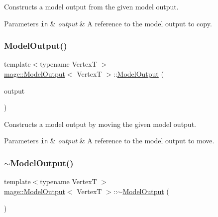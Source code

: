 Constructs a model output from the given model output.


\begin{DoxyParams}[1]{Parameters}
\mbox{\tt in}  & {\em output} & A reference to the model output to copy. \\
\hline
\end{DoxyParams}
\hypertarget{structmage_1_1_model_output_a1ed01fcfc7e13e9a304bfb771afd6f9a}{}\label{structmage_1_1_model_output_a1ed01fcfc7e13e9a304bfb771afd6f9a} 
\subsubsection{\texorpdfstring{Model\+Output()}{ModelOutput()}\hspace{0.1cm}{\footnotesize\ttfamily [3/3]}}
{\footnotesize\ttfamily template$<$typename VertexT $>$ \\
\hyperlink{structmage_1_1_model_output}{mage\+::\+Model\+Output}$<$ VertexT $>$\+::\hyperlink{structmage_1_1_model_output}{Model\+Output} (\begin{DoxyParamCaption}\item[{\hyperlink{structmage_1_1_model_output}{Model\+Output}$<$ VertexT $>$ \&\&}]{output }\end{DoxyParamCaption})\hspace{0.3cm}{\ttfamily [default]}}

Constructs a model output by moving the given model output.


\begin{DoxyParams}[1]{Parameters}
\mbox{\tt in}  & {\em output} & A reference to the model output to move. \\
\hline
\end{DoxyParams}
\hypertarget{structmage_1_1_model_output_a69a7f27486ad287943cbf973107ad8e1}{}\label{structmage_1_1_model_output_a69a7f27486ad287943cbf973107ad8e1} 
\subsubsection{\texorpdfstring{$\sim$\+Model\+Output()}{~ModelOutput()}}
{\footnotesize\ttfamily template$<$typename VertexT $>$ \\
\hyperlink{structmage_1_1_model_output}{mage\+::\+Model\+Output}$<$ VertexT $>$\+::$\sim$\hyperlink{structmage_1_1_model_output}{Model\+Output} (\begin{DoxyParamCaption}{ }\end{DoxyParamCaption})\hspace{0.3cm}{\ttfamily [default]}}

